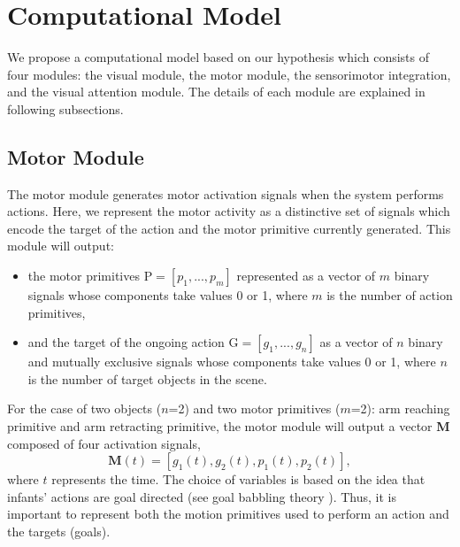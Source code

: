 \documentclass[conference]{IEEEtran}
\begin{document}
\section{Computational Model}
We propose a computational model based on our hypothesis which consists of four modules: the visual module, the motor module, the sensorimotor integration, and the visual attention module. The details of each module are explained in following subsections.

\subsection{Motor Module}
The motor module generates motor activation signals when the system performs actions. Here, we represent the motor activity as a distinctive set of signals which encode the target of the action and the motor primitive currently generated. This module will output:
\begin{itemize}
\item the motor primitives \(\text{P}=[\textit{p}_{1},...,\textit{p}_{m}]\) represented as a vector of $m$ binary signals whose components take values 0 or 1, where $m$ is the number of action primitives,
\item and the target of the ongoing action \(\text{G}=[\textit{g}_{1},...,\textit{g}_{n}]\) as a vector of $n$ binary and mutually exclusive signals whose components take values 0 or 1, where $n$ is the number of target objects in the scene.
\end{itemize}
For the case of two objects ($n$=2) and two motor primitives ($m$=2): arm reaching primitive and arm retracting primitive, the motor module will output a vector \textbf{M} composed of four activation signals,
\begin{equation}
	\textbf{M}(t)=[\textit{g}_{1}(t), \textit{g}_{2}(t), \textit{p}_{1}(t), \textit{p}_{2}(t)],
\end{equation}
where $t$ represents the time. The choice of variables is based on the idea that infants' actions are goal directed (see goal babbling theory \cite{rolf2012goal}). Thus, it is important to represent both the motion primitives used to perform an action and the targets (goals).
\end{document}
